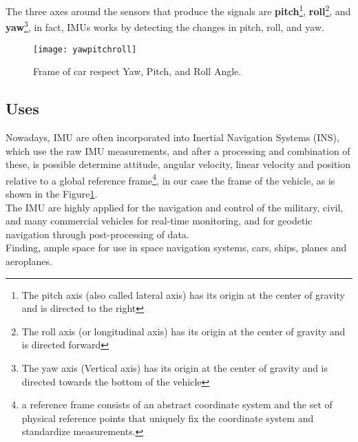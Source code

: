 \documentclass[tesi]{subfiles}
\begin{document}
\noindent The three axes around the sensors that produce the signals are \textbf{pitch}\footnote{The pitch axis (also called lateral axis) has its origin at the center of gravity and is directed to the right}, \textbf{roll}\footnote{The roll axis (or longitudinal axis) has its origin at the center of gravity and is directed forward}, and \textbf{yaw}\footnote{The yaw axis (Vertical axis) has its origin at the center of gravity and is directed towards the bottom of the vehicle}, in fact, IMUs works by detecting the changes in pitch, roll, and yaw.

\begin{center}
\begin{figure}[h]
\centering
\label{fig:Yaw Roll Pitch Frame of car}
\texttt{[image: yawpitchroll]}
\caption{Frame of car respect Yaw, Pitch, and Roll Angle.}
\end{figure}
\end{center}
\clearpage	
	
	
\subsection{Uses}\label{ssc:IMU Uses}
\noindent Nowadays, IMU are often incorporated into Inertial Navigation Systems (INS), which use the raw IMU measurements, and after a processing and combination of these, is possible determine attitude, angular velocity, linear velocity and position relative to a global reference frame\footnote{a reference frame consists of an abstract coordinate system and the set of physical reference points that uniquely fix the coordinate system and standardize measurements.}, in our case the frame of the vehicle, as is shown in the Figure\ref{fig:Yaw Roll Pitch Frame of car}.\\ 
The IMU are highly applied for the navigation and control of the military, civil, and many commercial vehicles for real-time monitoring, and for geodetic navigation through post-processing of data.\\
Finding, ample space for use in space navigation systems, cars, ships, planes and aeroplanes.\\
\end{document}
